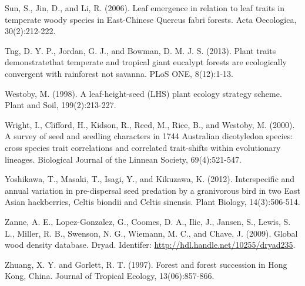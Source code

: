 \documentclass[openright,12pt,a4paper]{memoir}
\begin{document}
Sun, S., Jin, D., and Li, R. (2006). Leaf emergence in relation to leaf traits in temperate woody species in East-Chinese Quercus fabri forests. Acta Oecologica, 30(2):212-222.

Tng, D. Y. P., Jordan, G. J., and Bowman, D. M. J. S. (2013). Plant traits demonstratethat temperate and tropical giant eucalypt forests are ecologically convergent with rainforest not savanna. PLoS ONE, 8(12):1-13.

Westoby, M. (1998). A leaf-height-seed (LHS) plant ecology strategy scheme. Plant and Soil, 199(2):213-227.

Wright, I., Clifford, H., Kidson, R., Reed, M., Rice, B., and Westoby, M. (2000). A survey of seed and seedling characters in 1744 Australian dicotyledon species: cross species trait correlations and correlated trait-shifts within evolutionary lineages. Biological Journal of the Linnean Society, 69(4):521-547.

Yoshikawa, T., Masaki, T., Isagi, Y., and Kikuzawa, K. (2012). Interspecific and annual variation in pre-dispersal seed predation by a granivorous bird in two East Asian hackberries, Celtis biondii and Celtis sinensis. Plant Biology, 14(3):506-514.

Zanne, A. E., Lopez-Gonzalez, G., Coomes, D. A., Ilic, J., Jansen, S., Lewis, S. L., Miller, R. B., Swenson, N. G., Wiemann, M. C., and Chave, J. (2009). Global wood density database. Dryad. Identifer: \url{http://hdl.handle.net/10255/dryad235}.

Zhuang, X. Y. and Gorlett, R. T. (1997). Forest and forest succession in Hong Kong, China. Journal of Tropical Ecology, 13(06):857-866.




\renewcommand\bibname{{References}} 
\begin{small}


\end{small}
\end{document}
